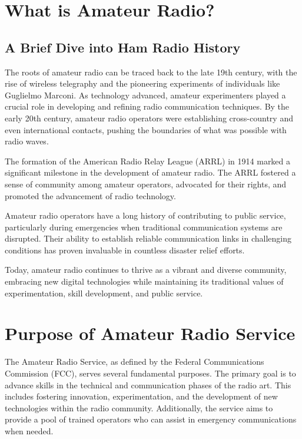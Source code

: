 \section{What is Amateur Radio?}

\subsection*{A Brief Dive into Ham Radio History}
\label{sec:ham_history}
The roots of amateur radio can be traced back to the late 19th century, with the rise of wireless telegraphy and the pioneering experiments of individuals like Guglielmo Marconi.  As technology advanced, amateur experimenters played a crucial role in developing and refining radio communication techniques. By the early 20th century, amateur radio operators were establishing cross-country and even international contacts, pushing the boundaries of what was possible with radio waves.   

The formation of the American Radio Relay League (ARRL) in 1914 marked a significant milestone in the development of amateur radio. The ARRL fostered a sense of community among amateur operators, advocated for their rights, and promoted the advancement of radio technology.

Amateur radio operators have a long history of contributing to public service, particularly during emergencies when traditional communication systems are disrupted. Their ability to establish reliable communication links in challenging conditions has proven invaluable in countless disaster relief efforts.

Today, amateur radio continues to thrive as a vibrant and diverse community, embracing new digital technologies while maintaining its traditional values of experimentation, skill development, and public service.

\section{Purpose of Amateur Radio Service}
\label{sec:amateur_purpose}

The Amateur Radio Service, as defined by the Federal Communications Commission (FCC), serves several fundamental purposes. The primary goal is to advance skills in the technical and communication phases of the radio art. This includes fostering innovation, experimentation, and the development of new technologies within the radio community. Additionally, the service aims to provide a pool of trained operators who can assist in emergency communications when needed.

